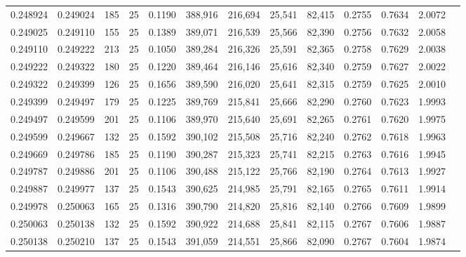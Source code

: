 \begin{tabular}{rrrrrrrrrrrrr}
0.248924 & 0.249024 &   185 &  25 &                                     0.1190 & 388,916 & 216,694 &  25,541 &  82,415 & 0.2755 & 0.7634 & 2.0072 \\
0.249025 & 0.249110 &   155 &  25 &                                     0.1389 & 389,071 & 216,539 &  25,566 &  82,390 & 0.2756 & 0.7632 & 2.0058 \\
0.249110 & 0.249222 &   213 &  25 &                                     0.1050 & 389,284 & 216,326 &  25,591 &  82,365 & 0.2758 & 0.7629 & 2.0038 \\
0.249222 & 0.249322 &   180 &  25 &                                     0.1220 & 389,464 & 216,146 &  25,616 &  82,340 & 0.2759 & 0.7627 & 2.0022 \\
0.249322 & 0.249399 &   126 &  25 &                                     0.1656 & 389,590 & 216,020 &  25,641 &  82,315 & 0.2759 & 0.7625 & 2.0010 \\
0.249399 & 0.249497 &   179 &  25 &                                     0.1225 & 389,769 & 215,841 &  25,666 &  82,290 & 0.2760 & 0.7623 & 1.9993 \\
0.249497 & 0.249599 &   201 &  25 &                                     0.1106 & 389,970 & 215,640 &  25,691 &  82,265 & 0.2761 & 0.7620 & 1.9975 \\
0.249599 & 0.249667 &   132 &  25 &                                     0.1592 & 390,102 & 215,508 &  25,716 &  82,240 & 0.2762 & 0.7618 & 1.9963 \\
0.249669 & 0.249786 &   185 &  25 &                                     0.1190 & 390,287 & 215,323 &  25,741 &  82,215 & 0.2763 & 0.7616 & 1.9945 \\
0.249787 & 0.249886 &   201 &  25 &                                     0.1106 & 390,488 & 215,122 &  25,766 &  82,190 & 0.2764 & 0.7613 & 1.9927 \\
0.249887 & 0.249977 &   137 &  25 &                                     0.1543 & 390,625 & 214,985 &  25,791 &  82,165 & 0.2765 & 0.7611 & 1.9914 \\
0.249978 & 0.250063 &   165 &  25 &                                     0.1316 & 390,790 & 214,820 &  25,816 &  82,140 & 0.2766 & 0.7609 & 1.9899 \\
0.250063 & 0.250138 &   132 &  25 &                                     0.1592 & 390,922 & 214,688 &  25,841 &  82,115 & 0.2767 & 0.7606 & 1.9887 \\
0.250138 & 0.250210 &   137 &  25 &                                     0.1543 & 391,059 & 214,551 &  25,866 &  82,090 & 0.2767 & 0.7604 & 1.9874 \\

\end{tabular}
